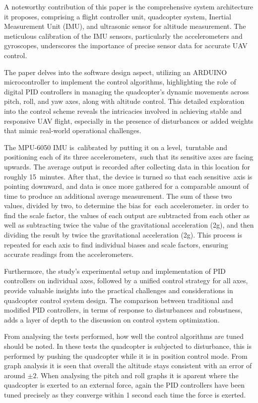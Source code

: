 \documentclass{report}
\begin{document}
A noteworthy contribution of this paper is the comprehensive system architecture
it proposes, comprising a flight controller unit, quadcopter system, Inertial
Measurement Unit (IMU), and ultrasonic sensor for altitude measurement. The
meticulous calibration of the IMU sensors, particularly the accelerometers and
gyroscopes, underscores the importance of precise sensor data for accurate UAV
control.

The paper delves into the software design aspect, utilizing an ARDUINO
microcontroller to implement the control algorithms, highlighting the role of
digital PID controllers in managing the quadcopter's dynamic movements across
pitch, roll, and yaw axes, along with altitude control. This detailed
exploration into the control scheme reveals the intricacies involved in
achieving stable and responsive UAV flight, especially in the presence of
disturbances or added weights that mimic real-world operational challenges.

The MPU-6050 IMU is calibrated by putting it on a level, turntable and
positioning each of its three accelerometers, such that its sensitive axes are
facing upwards. The average output is recorded after collecting data in this
location for roughly 15 minutes. After that, the device is turned so that each
sensitive axis is pointing downward, and data is once more gathered for a
comparable amount of time to produce an additional average measurement. The sum
of these two values, divided by two, to determine the bias for each
accelerometer. in order to find the scale factor, the values of each output are
subtracted from each other as well as subtracting twice the value of the
gravitational acceleration (2g), and then dividing the result by twice the
gravitational acceleration (2g). This process is repeated for each axis to find
individual biases and scale factors, ensuring accurate readings from the
accelerometers.

Furthermore, the study's experimental setup and implementation of PID
controllers on individual axes, followed by a unified control strategy for all
axes, provide valuable insights into the practical challenges and considerations
in quadcopter control system design. The comparison between traditional and
modified PID controllers, in terms of response to disturbances and robustness,
adds a layer of depth to the discussion on control system optimization.

From analysing the tests performed, how well the control algorithms are tuned
should be noted. In these tests the quadcopter is subjected to disturbance, this
is performed by pushing the quadcopter while it is in position control mode.
From graph analysis it is seen that overall the altitude stays consistent with
an error of around \(\pm2\). When analysing the pitch and roll graphs it is
aparent where the quadcopter is exerted to an external force, again the PID
controllers have been tuned precisely as they converge within 1 second each time
the force is exerted. 
\end{document}
